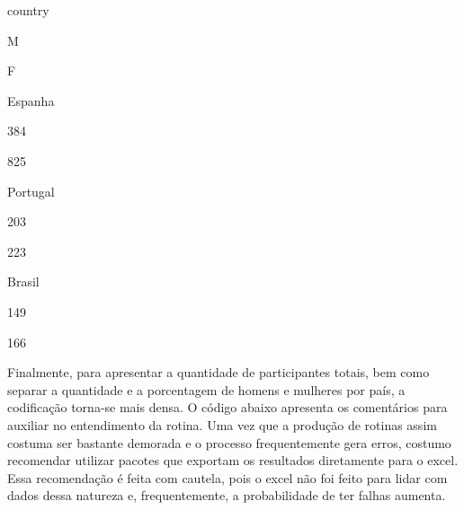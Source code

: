 \documentclass[
]{book}
\begin{document}
country

M

F

Espanha

384

825

Portugal

203

223

Brasil

149

166

Finalmente, para apresentar a quantidade de participantes totais, bem como separar a quantidade e a porcentagem de homens e mulheres por país, a codificação torna-se mais densa. O código abaixo apresenta os comentários para auxiliar no entendimento da rotina. Uma vez que a produção de rotinas assim costuma ser bastante demorada e o processo frequentemente gera erros, costumo recomendar utilizar pacotes que exportam os resultados diretamente para o excel. Essa recomendação é feita com cautela, pois o excel não foi feito para lidar com dados dessa natureza e, frequentemente, a probabilidade de ter falhas aumenta.
\end{document}
